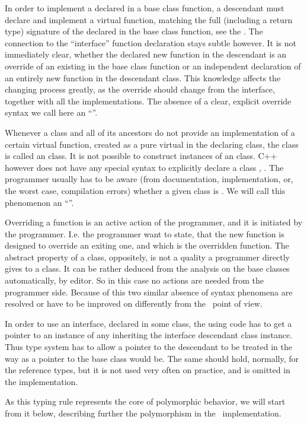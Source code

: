 In order to implement a declared in a base class function, a descendant must declare and implement
a virtual function, matching the full (including a return type) signature of the declared in the base class function, see the . 
The connection to the ``interface'' function declaration stays subtle however. It is not immediately clear, whether the 
declared new function in the descendant is an override of an existing in the base class function or an independent declaration
of an entirely new function in the descendant class. This knowledge affects the changing process greatly, as the 
override should change from the interface, together with all the implementations. The absence of a clear, 
explicit override syntax we call here an ``''.

Whenever a class and all of its ancestors do not provide an implementation of a certain virtual function,
created as a pure virtual in the declaring class, the class is called an  class. It is not possible
to construct instances of an  class. C++ however does not have any special syntax to explicitly declare a 
class ,  .
The programmer usually has to be aware (from documentation, implementation, or, the worst case, compilation
errors) whether a given class is . We will call this phenomenon an ``''.

Overriding a function is an active action of the programmer, and it is initiated by the 
programmer. I.e. the programmer want to state, that the new function is designed to override an exiting one, and 
which is the overridden function. The abstract property of a class, oppositely, is not a quality a programmer directly
gives to a class. It can be rather deduced from the analysis on the base classes automatically, by editor. So in this case
no actions are needed from the programmer side. Because of this two similar absence of syntax phenomena are resolved or
have to be improved on differently from the \pcpp\ point of view.

In order to use an interface, declared in some class, the using code has to get a pointer to an instance
of any inheriting the interface descendant class instance. Thus type system has to allow a pointer
to the descendant to be treated in the way as a pointer to the base class would be. The same should hold, 
normally, for the reference types, but it is not used very often on practice, and is omitted in the implementation.

As this typing rule represents the core of polymorphic behavior, we will start from it below, describing further the
polymorphism in the \pcpp\ implementation.


